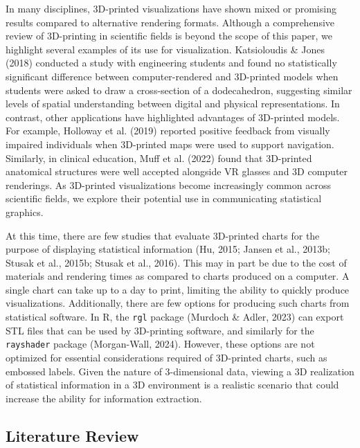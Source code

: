 \documentclass[phd]{nuthesis}
\begin{document}
In many disciplines, 3D-printed visualizations have shown mixed or
promising results compared to alternative rendering formats. Although a
comprehensive review of 3D-printing in scientific fields is beyond the
scope of this paper, we highlight several examples of its use for
visualization. Katsioloudis \& Jones (2018) conducted a study with
engineering students and found no statistically significant difference
between computer-rendered and 3D-printed models when students were asked
to draw a cross-section of a dodecahedron, suggesting similar levels of
spatial understanding between digital and physical representations. In
contrast, other applications have highlighted advantages of 3D-printed
models. For example, Holloway et al. (2019) reported positive feedback
from visually impaired individuals when 3D-printed maps were used to
support navigation. Similarly, in clinical education, Muff et al. (2022)
found that 3D-printed anatomical structures were well accepted alongside
VR glasses and 3D computer renderings. As 3D-printed visualizations
become increasingly common across scientific fields, we explore their
potential use in communicating statistical graphics.

At this time, there are few studies that evaluate 3D-printed charts for
the purpose of displaying statistical information (Hu, 2015; Jansen et
al., 2013b; Stusak et al., 2015b; Stusak et al., 2016). This may in part
be due to the cost of materials and rendering times as compared to
charts produced on a computer. A single chart can take up to a day to
print, limiting the ability to quickly produce visualizations.
Additionally, there are few options for producing such charts from
statistical software. In R, the \texttt{rgl} package (Murdoch \& Adler,
2023) can export STL files that can be used by 3D-printing software, and
similarly for the \texttt{rayshader} package (Morgan-Wall, 2024).
However, these options are not optimized for essential considerations
required of 3D-printed charts, such as embossed labels. Given the nature
of 3-dimensional data, viewing a 3D realization of statistical
information in a 3D environment is a realistic scenario that could
increase the ability for information extraction.

\subsection{Literature Review}\label{literature-review-1}
\end{document}
